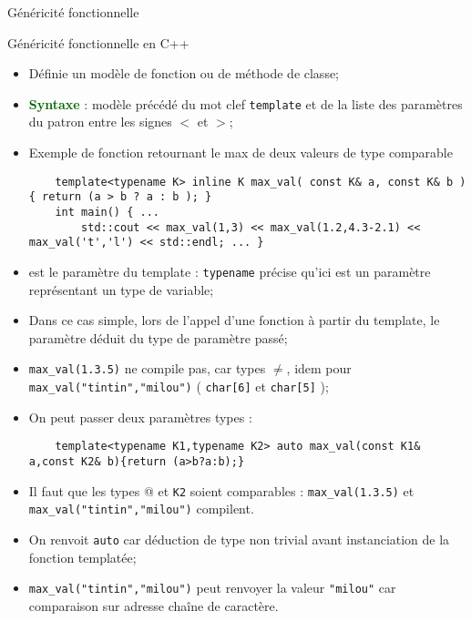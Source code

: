 \documentclass[compress,10pt,aspectratio=169]{beamer}
\begin{document}
  \begin{frame}[fragile]{Généricité fonctionnelle}
    \scriptsize\vspace*{-4mm}
    \begin{block}{\small Généricité fonctionnelle en C++}
    \begin{itemize}
    \item Définie un modèle de fonction ou de méthode de classe;
    \item \textcolor{DarkGreen}{\textbf{Syntaxe}} : modèle précédé du mot clef \texttt{template} et de la liste 
          des paramètres du patron entre les signes $<$ et $>$;
    \item {\color{blue}Exemple de fonction retournant le max de deux valeurs de type comparable}
    \begin{verbatim}
    template<typename K> inline K max_val( const K& a, const K& b ) { return (a > b ? a : b ); }
    int main() { ...
        std::cout << max_val(1,3) << max_val(1.2,4.3-2.1) << max_val('t','l') << std::endl; ... }
    \end{verbatim}
    \item \verb@K@ est le paramètre du template : \texttt{typename} précise qu'ici \verb@K@ est 
          un paramètre représentant un type de variable;
    \item Dans ce cas simple, lors de l'appel d'une fonction à partir du 
          template, le paramètre \verb@K@ déduit du type de paramètre passé;
    \item \texttt{max_val(1.3.5)} ne compile pas, car types $\neq$,
          idem pour \texttt{max_val("tintin","milou")} ( \texttt{char[6]} et 
          \texttt{char[5]} );
    \item On peut passer deux paramètres types :
    \begin{verbatim}
    template<typename K1,typename K2> auto max_val(const K1& a,const K2& b){return (a>b?a:b);}
    \end{verbatim}
    \item Il faut que les types @ et \verb$K2$ soient comparables : 
          \texttt{max_val(1.3.5)}  et \texttt{max_val("tintin","milou")} compilent.
    \item On renvoit \texttt{auto} car déduction de type non trivial avant instanciation de la 
          fonction templatée;
    \item \texttt{max_val("tintin","milou")} peut renvoyer la valeur \texttt{"milou"}
          car comparaison sur adresse chaîne de caractère.
    \end{itemize}
    \end{block}
  \end{frame}
    
\end{document}
